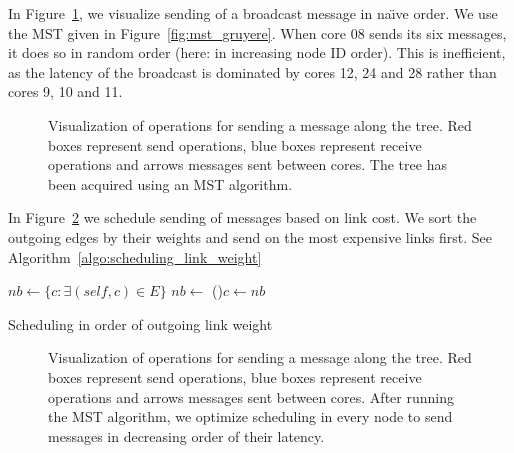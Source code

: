 \documentclass{article}
\newcommand{\naive}{na\"{\i}ve\xspace}
\begin{document}
In Figure~\ref{fig:mst_gruyere_operations}, we visualize sending of a
broadcast message in \naive order. We use the MST given in
Figure~\ref{fig:mst_gruyere}.  When core 08 sends its six messages, it
does so in random order (here: in increasing node ID order). This is
inefficient, as the latency of the broadcast is dominated by cores 12,
24 and 28 rather than cores 9, 10 and 11.

\begin{figure}[htb]
  \centering
  \begin{tikzpicture}[scale=.35,transform shape]
    
  \end{tikzpicture}
  \caption{Visualization of operations for sending a message along the
    tree. Red boxes represent send operations, blue boxes represent
    receive operations and arrows messages sent between cores. The
    tree has been acquired using an MST algorithm.}
  \label{fig:mst_gruyere_operations}
\end{figure}

In Figure~\ref{fig:mst_gruyere_operations_sorted} we schedule sending
of messages based on link cost. We sort the outgoing edges by their
weights and send on the most expensive links first. See
Algorithm~\ref{algo:scheduling_link_weight}

\begin{algorithm}[htb]
%
%
%
  \BlankLine
  $nb \leftarrow \{ c: \exists (self, c) \in E \}$
  $nb \leftarrow $ 
  \For(){$c \leftarrow nb$}{
  }
  \caption{Scheduling in order of outgoing link weight}
  \label{algo:scheduling_link_weight}
\end{algorithm}

\begin{figure}[htb]
  \centering
  \begin{tikzpicture}[scale=.35,transform shape]
    
  \end{tikzpicture}
  \caption{Visualization of operations for sending a message along the
    tree. Red boxes represent send operations, blue boxes represent
    receive operations and arrows messages sent between cores. After
    running the MST algorithm, we optimize scheduling in every node to
    send messages in decreasing order of their latency.}
  \label{fig:mst_gruyere_operations_sorted}
\end{figure}
\end{document}
